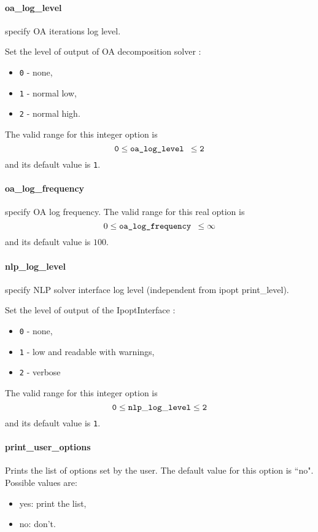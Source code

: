 \paragraph{oa\_log\_level}
\label{oa_log_level}
 specify OA iterations log level.

 Set the level of output of OA decomposition solver :
 \begin{itemize}
  \item {\tt 0} - none,
  \item {\tt 1} - normal low,
  \item {\tt 2} - normal high.
  \end{itemize}
  The valid range for this integer option is
  $${\tt 0} \le \hbox{\tt oa\_log\_level } \le {\tt 2}$$
  and its default value is {\tt 1}.

\paragraph{oa\_log\_frequency} 
\label{oa_log_frequency}
specify OA log frequency.
  The valid range for this real option is
  $$ 0 \le \hbox{\tt oa\_log\_frequency } \le \infty $$
  and its default value is $100$.


\paragraph{nlp\_log\_level}
\label{nlp_log_level}
 specify NLP solver interface log level (independent from ipopt print\_level).

  Set the level of output of the IpoptInterface :
  \begin{itemize}
  \item {\tt 0} - none,
  \item {\tt 1} - low and readable with warnings,
  \item {\tt 2} - verbose
  \end{itemize}
 The valid range for this integer option is
$${\tt 0} \le {\tt nlp\_log\_level } \le {\tt 2}$$
and its default value is {\tt 1}.

\paragraph{print\_user\_options}
\label{print_user_options}
Prints the list of options set by the user.
The default value for this option is ``no".\\
Possible values are:
\begin{itemize}
\item yes: print the list,
\item no: don't.
\end{itemize}

